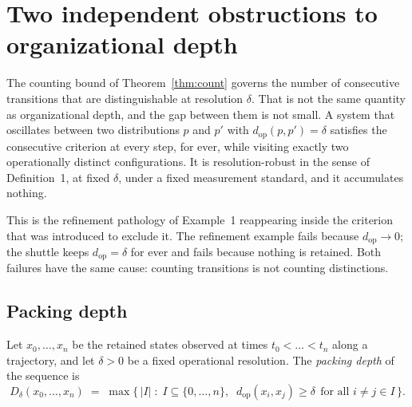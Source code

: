 %

\section{Two independent obstructions to organizational depth}
\label{sec:twofactor}

The counting bound of Theorem~\ref{thm:count} governs the number of consecutive
transitions that are distinguishable at resolution $\delta$. That is not the same
quantity as organizational depth, and the gap between them is not small. A system
that oscillates between two distributions $p$ and $p'$ with
$d_{\mathrm{op}}(p,p')=\delta$ satisfies the consecutive criterion at every step, for
ever, while visiting exactly two operationally distinct configurations. It is
resolution-robust in the sense of Definition~1, at fixed $\delta$, under a fixed
measurement standard, and it accumulates nothing.

This is the refinement pathology of Example~1 reappearing inside the criterion that
was introduced to exclude it. The refinement example fails because
$d_{\mathrm{op}}\to0$; the shuttle keeps $d_{\mathrm{op}}=\delta$ for ever and fails
because nothing is retained. Both failures have the same cause: counting transitions
is not counting distinctions.

\subsection{Packing depth}

\begin{definition}
\label{def:packingdepth}
Let $x_0,\dots,x_n$ be the retained states observed at times $t_0<\dots<t_n$ along a
trajectory, and let $\delta>0$ be a fixed operational resolution. The
\emph{packing depth} of the sequence is
\begin{equation}
  D_\delta(x_0,\dots,x_n)
  \;=\;
  \max\bigl\{\,|I| \;:\; I\subseteq\{0,\dots,n\},\;\;
    d_{\mathrm{op}}(x_i,x_j)\ge\delta\ \ \text{for all } i\ne j\in I \,\bigr\}.
\end{equation}
\end{definition}


